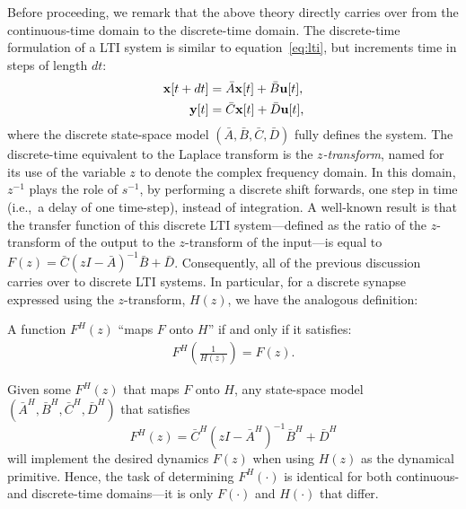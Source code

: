 Before proceeding, we remark that the above theory directly carries over from the continuous-time domain to the discrete-time domain.
The discrete-time formulation of a LTI system is similar to equation~\ref{eq:lti}, but increments time in steps of length $dt$:
\begin{equation} \label{eq:dlti}
\begin{split}
\mathbf{x}[t+dt] &= \bar{A}\mathbf{x}[t] + \bar{B}\mathbf{u}[t] \text{,} \\
\mathbf{y}[t] &= \bar{C}\mathbf{x}[t] + \bar{D}\mathbf{u}[t] \text{,}
\end{split}
\end{equation}
where the discrete state-space model $\left( \bar{A}\text{,}\, \bar{B}\text{,}\, \bar{C}\text{,}\, \bar{D} \right)$ fully defines the system.
The discrete-time equivalent to the Laplace transform is the $z$\emph{-transform}, named for its use of the variable $z$ to denote the complex frequency domain.
In this domain, $z^{-1}$ plays the role of $s^{-1}$, by performing a discrete shift forwards, one step in time (i.e.,~a delay of one time-step), instead of integration.
A well-known result is that the transfer function of this discrete LTI system---defined as the ratio of the $z$-transform of the output to the $z$-transform of the input---is equal to $F(z) = \bar{C} (zI - \bar{A})^{-1} \bar{B} + \bar{D}$.
Consequently, all of the previous discussion carries over to discrete LTI systems.
In particular, for a discrete synapse expressed using the $z$-transform, $H(z)$, we have the analogous definition:
\begin{definition} \label{def:discrete-maps-onto}
A function $F^{H}(z)$ ``maps $F$ onto $H$'' if and only if it satisfies:
\begin{align} \label{eq:discrete-maps-onto}
F^{H}\left( \frac{1}{H(z)} \right) = F(z) \text{.}
\end{align}
\end{definition}
Given some $F^{H}(z)$ that maps $F$ onto $H$, any state-space model $\left( \bar{A}^H\text{,}\, \bar{B}^H\text{,}\, \bar{C}^H\text{,}\, \bar{D}^H \right)$ that satisfies
\begin{equation} \label{eq:dss-mapped}
F^{H} \left( z \right) = \bar{C}^H \left( zI - \bar{A}^H \right)^{-1}\bar{B}^H + \bar{D}^H
\end{equation}
will implement the desired dynamics $F(z)$ when using $H(z)$ as the dynamical primitive.
Hence, the task of determining $F^{H}(\cdot)$ is identical for both continuous- and discrete-time domains---it is only $F(\cdot)$ and $H(\cdot)$ that differ.

